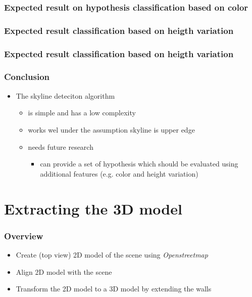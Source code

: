 \documentclass{beamer}
\begin{document}
\frame
{
	\frametitle{Expected result on hypothesis classification based on color}
}

\frame
{
	\frametitle{Expected result classification based on heigth variation}
}
\frame
{
	\frametitle{Expected result classification based on heigth variation}
}

\frame
{
	\frametitle{Conclusion}
	\begin{itemize}
	\item <+-| alert@+> The skyline deteciton algorithm 
		\begin{itemize}
		\item <+-| alert@+> is simple and has a low complexity
		\item <+-| alert@+> works wel under the assumption skyline is upper edge
		\item <+-| alert@+> needs future research
			\begin{itemize}
			\item <+-| alert@+> can provide a set of hypothesis which should be evaluated using additional features
			(e.g. color and height variation)
			\end{itemize}
		\end{itemize}
	\end{itemize}
}





\section{Extracting the 3D model}
\frame
{
	\frametitle{Overview}
	\begin{itemize}
	\item <+-| alert@+> Create (top view) 2D model of the scene using \emph{Openstreetmap}
	\item <+-| alert@+> Align 2D model with the scene 
	\item <+-| alert@+> Transform the 2D model to a 3D model by extending the walls
	\end{itemize}
}
\end{document}
